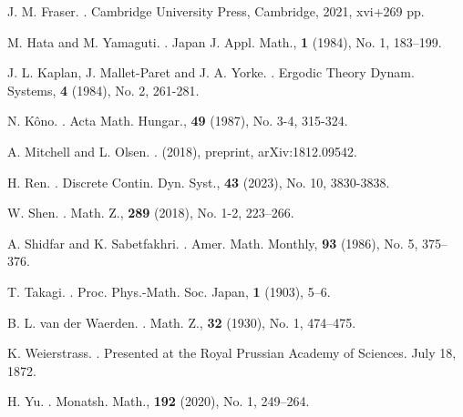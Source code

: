 \documentclass{amsart}
\theoremstyle{definition}
\theoremstyle{remark}
\numberwithin{equation}{section}
\begin{document}
\begin{thebibliography}{11}
J. M. Fraser.
. 
\newblock Cambridge University Press, Cambridge, 2021, xvi+269 pp.

M. Hata and M. Yamaguti.
.
\newblock  Japan J. Appl. Math., {\bf 1} (1984), No. 1, 183--199.


J. L. Kaplan, J. Mallet-Paret and J. A. Yorke.
.
\newblock Ergodic Theory Dynam. Systems, {\bf 4} (1984), No. 2, 261-281.



N. Kôno.
.
\newblock Acta Math. Hungar., {\bf 49} (1987), No. 3-4, 315-324.





A. Mitchell and L. Olsen.
.
\newblock  (2018), preprint, arXiv:1812.09542.



H. Ren.
.
\newblock Discrete Contin. Dyn. Syst., {\bf 43} (2023), No. 10, 3830-3838.

W. Shen.
.
\newblock Math. Z., {\bf 289} (2018), No. 1-2, 223--266.

A. Shidfar and K. Sabetfakhri.
.
\newblock Amer. Math. Monthly, {\bf 93} (1986), No. 5, 375--376.


T. Takagi.
.
\newblock Proc. Phys.-Math. Soc. Japan, {\bf 1} (1903), 5--6.


B. L. van der Waerden.
.
\newblock Math. Z., {\bf 32} (1930), No. 1, 474--475.

K. Weierstrass.
.
\newblock Presented at the Royal Prussian Academy of Sciences. July 18, 1872.



H. Yu.
.
\newblock Monatsh. Math., {\bf 192} (2020), No. 1, 249--264.

\end{thebibliography}
\end{document}
